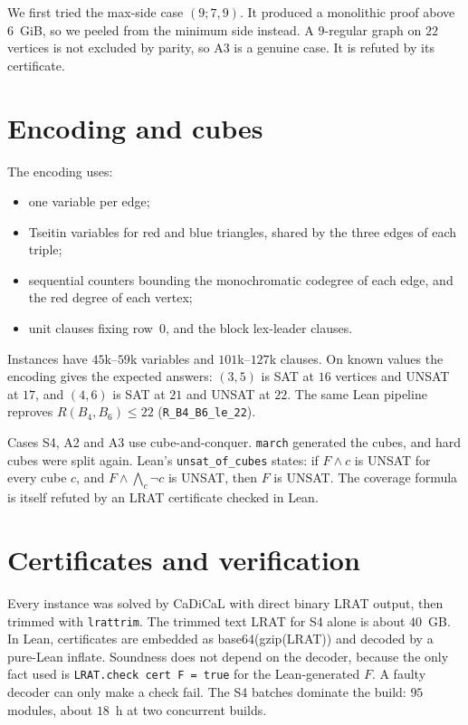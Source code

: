 \documentclass[11pt]{amsart}
\theoremstyle{definition}
\begin{document}
We first tried the max-side case $(9;7,9)$. It produced a monolithic
proof above $6$~GiB, so we peeled from the minimum side instead. A
$9$-regular graph on $22$ vertices is not excluded by parity, so A3 is
a genuine case. It is refuted by its certificate.

\section{Encoding and cubes}

The encoding uses:
\begin{itemize}
\item one variable per edge;
\item Tseitin variables for red and blue triangles, shared by the
three edges of each triple;
\item sequential counters bounding the monochromatic codegree of each
edge, and the red degree of each vertex;
\item unit clauses fixing row~$0$, and the block lex-leader clauses.
\end{itemize}
Instances have $45$k--$59$k variables and $101$k--$127$k clauses. On
known values the encoding gives the expected answers: $(3,5)$ is SAT
at $16$ vertices and UNSAT at $17$, and $(4,6)$ is SAT at $21$ and
UNSAT at $22$. The same Lean pipeline reproves $R(B_4,B_6)\le 22$
(\texttt{R\_B4\_B6\_le\_22}).

Cases S4, A2 and A3 use cube-and-conquer. \texttt{march} generated the
cubes, and hard cubes were split again. Lean's
\texttt{unsat\_of\_cubes} states: if $F\wedge c$ is UNSAT for every
cube $c$, and $F\wedge\bigwedge_c\neg c$ is UNSAT, then $F$ is UNSAT.
The coverage formula is itself refuted by an LRAT certificate checked
in Lean.

\section{Certificates and verification}

Every instance was solved by CaDiCaL with direct binary LRAT output,
then trimmed with \texttt{lrattrim}. The trimmed text LRAT for S4
alone is about $40$~GB. In Lean, certificates are embedded as
base64(gzip(LRAT)) and decoded by a pure-Lean inflate. Soundness does
not depend on the decoder, because the only fact used is
\texttt{LRAT.check cert F = true} for the Lean-generated $F$. A faulty
decoder can only make a check fail. The S4 batches dominate the build:
$95$ modules, about $18$~h at two concurrent builds.
\end{document}
